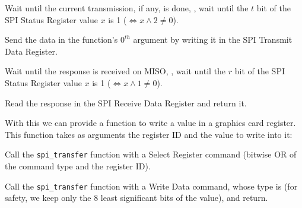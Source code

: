 \begin{Paragraph}
\begin{paracol}{2}

Wait until the current transmission, if any, is done, \ie, wait until the $t$
bit of the SPI Status Register value $x$ is 1 ($\Leftrightarrow x \wedge 2 \ne
0$).


Send the data in the function's $0^{th}$ argument by writing it in the SPI
Transmit Data Register.


Wait until the response is received on MISO, \ie, wait until the $r$ bit of the
SPI Status Register value $x$ is 1  ($\Leftrightarrow x \wedge 1 \ne 0$).


Read the response in the SPI Receive Data Register and return it.

\end{paracol}
\end{Paragraph}

With this we can provide a function to write a value in a graphics card
register. This function takes as arguments the register ID and the value to
write into it:

\begin{Paragraph}
\begin{paracol}{2}

Call the \verb!spi_transfer! function with a Select Register command (bitwise
OR of the command type  and the register ID).


Call the \verb!spi_transfer! function with a Write Data command, whose type is
 (for safety, we keep only the 8 least significant bits of the value),
and return.

\end{paracol}
\end{Paragraph}

